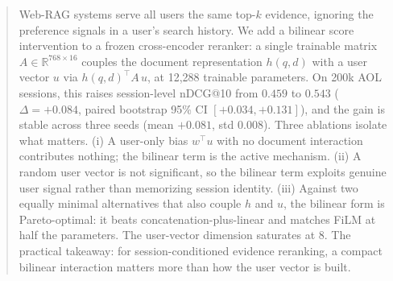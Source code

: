 \begin{abstract}
Web-RAG systems serve all users the same top-$k$ evidence, ignoring the preference signals in a user's search history. We add a bilinear score intervention to a frozen cross-encoder reranker: a single trainable matrix $A \in \mathbb{R}^{768 \times 16}$ couples the document representation $h(q,d)$ with a user vector $u$ via $h(q,d)^\top A\, u$, at 12{,}288 trainable parameters. On 200k AOL sessions, this raises session-level nDCG@10 from $0.459$ to $0.543$ ($\Delta{=}{+}0.084$, paired bootstrap 95\% CI $[+0.034, +0.131]$), and the gain is stable across three seeds (mean $+0.081$, std $0.008$). Three ablations isolate what matters. (i) A user-only bias $w^\top u$ with no document interaction contributes nothing; the bilinear term is the active mechanism. (ii) A random user vector is not significant, so the bilinear term exploits genuine user signal rather than memorizing session identity. (iii) Against two equally minimal alternatives that also couple $h$ and $u$, the bilinear form is Pareto-optimal: it beats concatenation-plus-linear and matches FiLM at half the parameters. The user-vector dimension saturates at 8. The practical takeaway: for session-conditioned evidence reranking, a compact bilinear interaction matters more than how the user vector is built.

\end{abstract}
